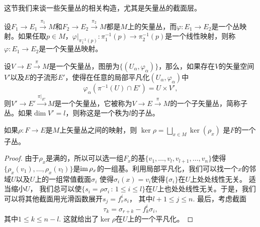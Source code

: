 这节我们来谈一些矢量丛的相关构造，尤其是矢量丛的截面层。

\begin{para}[矢量丛映射]
	设$F_1\to E_1\xrightarrow{\pi_1} M$和$F_2\to E_2\xrightarrow{\pi_2} M$都是$M$上的矢量丛，而$\varphi:E_1\to E_2$是一个丛映射。如果任取$p\in M$，$\varphi|_{\pi_1^{-1}(p)}:\pi_1^{-1}(p)\to \pi_2^{-1}(p)$是一个线性映射，则称$\varphi:E_1\to E_2$是一个矢量丛映射。
	\end{para}
	
	\begin{para}[矢量丛的子丛]
		设$V\to E\xrightarrow{\pi} M$是一个矢量丛，图册为$\{(U_\alpha,\varphi_\alpha)\}$，那么，如果存在$V$的矢量空间$V'$以及$E$的子流形$E'$，使得在任意的局部平凡化$(U_\alpha,\varphi_\alpha)$中
		\[
			\varphi_\alpha(\pi^{-1}(U)\cap E')=U\times V',
		\]
		则$V'\to E'\xrightarrow{\pi|_{E'}}M$是一个矢量丛，它被称为$V\to E\xrightarrow{\pi} M$的一个子矢量丛，简称子丛。如果$\dim V'=l$，则称这是一个秩为$l$的子丛。
	\end{para}
	
	\begin{lem}\label{lem:1.5.16}
		如果$\rho:F\to E$是$M$上矢量丛之间的映射，则
		$
			\ker \rho=\bigsqcup_{x\in M}\ker (\rho_x)
		$
		是$F$的一个子丛。
	\end{lem}	
	
	\begin{proof}
		由于$\rho_x$是满的，所以可以选一组$F_x$的基$\{v_1,\dots,v_l,v_{l+1},\dots,v_n\}$使得$\{\rho_x(v_1),\dots,\rho_x(v_l)\}$是$\operatorname{im} \rho_x$的一组基。利用局部平凡化，我们可以找一个$x$的邻域$U$以及$U$上的一组常值截面$\sigma_i$
		使得$\sigma_i(x)=v_i$使得$\{\sigma_i\}$在$U$上处处线性无关。
		适当缩小$U$，
		我们总可以使$\{s_i=\rho\sigma_i\,:\, 1\leq i\leq l\}$在$U$上也处处线性无关。于是，我们可以将其他截面用光滑函数展开$s_j = f^i_{r}s_i$，
		其中$l+1\leq j\leq n$. 最后，考虑截面
		\[
			\tau_{k}=\sigma_{r+k}-f_{k}^i\sigma_i,
		\]
		其中$1\leq k\leq n-l$. 这就给出了$\ker \rho$在$U$上的一个平凡化。
	\end{proof}
	
